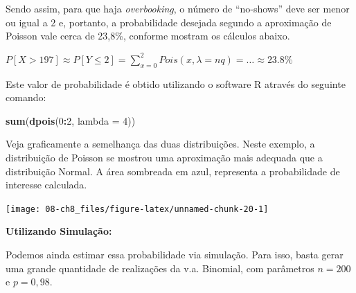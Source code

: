 \documentclass[
]{book}
\newenvironment{Shaded}{\begin{snugshade}}{\end{snugshade}}
\newcommand{\DataTypeTok}[1]{\textcolor[rgb]{0.13,0.29,0.53}{#1}}
\newcommand{\DecValTok}[1]{\textcolor[rgb]{0.00,0.00,0.81}{#1}}
\newcommand{\KeywordTok}[1]{\textcolor[rgb]{0.13,0.29,0.53}{\textbf{#1}}}
\newcommand{\NormalTok}[1]{#1}
\newcommand{\OperatorTok}[1]{\textcolor[rgb]{0.81,0.36,0.00}{\textbf{#1}}}
\theoremstyle{definition}
\theoremstyle{definition}
\theoremstyle{definition}
\theoremstyle{remark}
\begin{document}
Sendo assim, para que haja \emph{overbooking}, o número de ``no-shows'' deve ser menor ou igual a 2 e, portanto, a probabilidade desejada segundo a aproximação de Poisson vale cerca de 23,8\%, conforme mostram os cálculos abaixo.

\(P[X > 197] \approx P[Y \leq 2] = \sum_{x=0}^{2} Pois (x, \lambda = nq) =\ldots \approx 23.8\%\)

Este valor de probabilidade é obtido utilizando o software R através do seguinte comando:

\begin{Shaded}
\begin{Highlighting}[]
\KeywordTok{sum}\NormalTok{(}\KeywordTok{dpois}\NormalTok{(}\DecValTok{0}\OperatorTok{:}\DecValTok{2}\NormalTok{, }\DataTypeTok{lambda =} \DecValTok{4}\NormalTok{))}
\end{Highlighting}
\end{Shaded}

Veja graficamente a semelhança das duas distribuições. Neste exemplo, a distribuição de Poisson se mostrou uma aproximação mais adequada que a distribuição Normal. A área sombreada em azul, representa a probabilidade de interesse calculada.

\begin{center}\texttt{[image: 08-ch8\_files/figure-latex/unnamed-chunk-20-1]} \end{center}

\textbf{Utilizando Simulação:}

Podemos ainda estimar essa probabilidade via simulação. Para isso, basta gerar uma grande quantidade de realizações da v.a. Binomial, com parâmetros \(n = 200\) e \(p = 0,98\).
\end{document}

